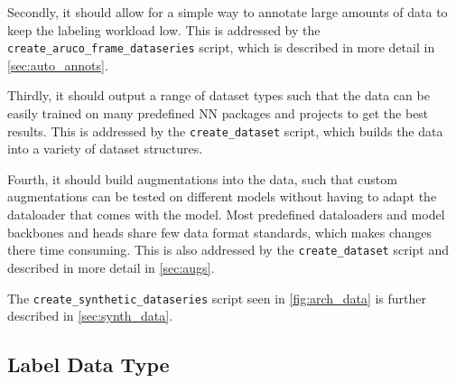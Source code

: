 \documentclass[10pt]{book}
\newcommand{\figureref}[1]{\autoref{#1}}
\begin{document}
Secondly, it should allow for a simple way to annotate large amounts of data to keep the labeling workload low. This is addressed by the \texttt{create\_aruco\_frame\_dataseries} script, which is described in more detail in \autoref{sec:auto_annots}.

Thirdly, it should output a range of dataset types such that the data can be easily trained on many predefined \ac{NN} packages and projects to get the best results. This is addressed by the \texttt{create\_dataset} script, which builds the data into a variety of dataset structures.

Fourth, it should build augmentations into the data, such that custom augmentations can be tested on different models without having to adapt the dataloader that comes with the model. Most predefined dataloaders and model backbones and heads share few data format standards, which makes changes there time consuming. This is also addressed by the \texttt{create\_dataset} script and described in more detail in \autoref{sec:augs}.


The \texttt{create\_synthetic\_dataseries} script seen in \figureref{fig:arch_data} is further described in \autoref{sec:synth_data}.

\subsection{Label Data Type}
\label{sec:label_data_type}
\end{document}
